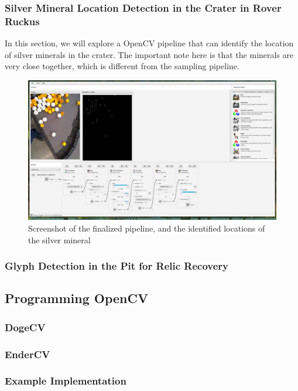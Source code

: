 \documentclass[../main.tex]{subfiles}
\begin{document}
\subsubsection{Silver Mineral Location Detection in the Crater in Rover Ruckus}
In this section, we will explore a OpenCV pipeline that can identify the location of silver minerals in the crater. The important note here is that the minerals are very close together, which is different from the sampling pipeline.
\begin{figure}[H]
    \centering
    \includegraphics[width=400pt]{sections/vision/images/opencv/crater_grip_screenshot.png}
    \caption{Screenshot of the finalized pipeline, and the identified locations of the silver mineral}
\end{figure}
\subsubsection{Glyph Detection in the Pit for Relic Recovery}
\subsection{Programming OpenCV}
\subsubsection{DogeCV}
\subsubsection{EnderCV}
\subsubsection{Example Implementation}
\end{document}
